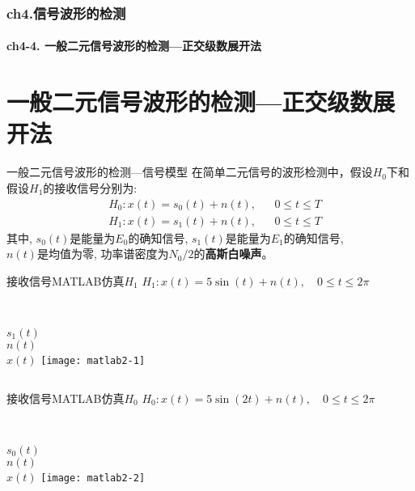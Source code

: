 \begin{frame}[shrink]
  \frametitle{ch4.信号波形的检测}
  \framesubtitle{ch4-4. 一般二元信号波形的检测---正交级数展开法}
  \tableofcontents[hideallsubsections]
\end{frame}

\section{一般二元信号波形的检测---正交级数展开法}

\begin{frame}{一般二元信号波形的检测---信号模型}
在简单二元信号的波形检测中，假设$H_0$下和假设$H_1$的接收信号分别为:
\begin{align*}
&H_0: x(t)=s_0(t)+n(t), &&0\le t\le T\\
&H_1: x(t)=s_1(t)+n(t), &&0\le t\le T
\end{align*}
其中, $s_0(t)$是能量为$E_0$的确知信号, $s_1(t)$是能量为$E_1$的确知信号, \\
$n(t)$是均值为零, 功率谱密度为$N_0/2$的\textbf{高斯白噪声}。
\end{frame}

\begin{frame}[shrink]{接收信号MATLAB仿真$H_1$}
$H_1: x(t)=5\sin(t)+n(t),\quad 0 \le t\le 2\pi $\\
\vspace{0.5cm}
\begin{columns}%
~\\
\vspace{0.5cm}
$s_1(t)$\\
\vspace{0.7cm}
$n(t)$\\
\vspace{0.7cm}
$x(t)$
\texttt{[image: matlab2-1]}
\end{columns}
\end{frame}

\begin{frame}[shrink]{接收信号MATLAB仿真$H_0$}
$H_0: x(t)=5\sin(2t)+n(t),\quad 0 \le t\le 2\pi $\\
\vspace{1.8cm}
\begin{columns}%
	~\\
	$s_0(t)$\\
	\vspace{1cm}
	$n(t)$\\
	\vspace{1.5cm}
	$x(t)$
	\texttt{[image: matlab2-2]}
\end{columns}
\end{frame}

